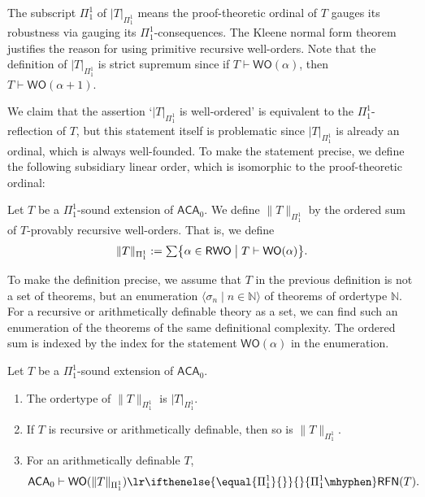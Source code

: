 \documentclass{mhkr}
\newcommand{\added}[1]{#1}
\newcommand{\lag}{\langle}
\newcommand{\rag}{\rangle}
\newcommand{\bbN}{\mathbb{N}}
\newcommand{\WO}{\mathsf{WO}}
\newcommand{\RFN}[1][]{\ifthenelse{\equal{#1}{}}{}{#1\mhyphen}\mathsf{RFN}}
\newcommand{\ACA}{\mathsf{ACA}}
\begin{document}
The subscript $\Pi^1_1$ of $|T|_{\Pi^1_1}$ means the proof-theoretic ordinal of $T$ gauges its robustness via gauging its $\Pi^1_1$-consequences.
The Kleene normal form theorem justifies the reason for using primitive recursive well-orders. 
\added{Note that the definition of $|T|_{\Pi^1_1}$ is strict supremum since if $T\vdash \WO(\alpha)$, then $T\vdash \WO(\alpha+1)$.

We claim that the assertion `$|T|_{\Pi^1_1}$ is well-ordered' is equivalent to the $\Pi^1_1$-reflection of $T$, but this statement itself is problematic since $|T|_{\Pi^1_1}$ is already an ordinal, which is always well-founded. To make the statement precise, we define the following subsidiary linear order, which is isomorphic to the proof-theoretic ordinal:
\begin{definition}
    Let $T$ be a $\Pi^1_1$-sound extension of $\ACA_0$. We define $\|T\|_{\Pi^1_1}$ by the ordered sum of $T$-provably recursive well-orders. That is, we define
    \begin{equation*} \textstyle
        \|T\|_{\Pi^1_1} := \sum \bigl\{\alpha \in \mathsf{RWO} \bigm| T\vdash\WO(\alpha)\bigr\}.
    \end{equation*}
\end{definition}
To make the definition precise, we assume that $T$ in the previous definition is not a set of theorems, but an enumeration $\lag \sigma_n\mid n\in \bbN\rag$ of theorems of ordertype $\bbN$. For a recursive or arithmetically definable theory as a set, we can find such an enumeration of the theorems of the same definitional complexity. The ordered sum is indexed by the index for the statement $\WO(\alpha)$ in the enumeration.
}
\begin{theorem}\label{Theorem: Pi 1 1 reflection and WOness of proof-theoretic ordinal}
    Let $T$ be a $\Pi^1_1$-sound extension of $\ACA_0$. \added{
    \begin{enumerate}
        \item The ordertype of $\|T\|_{\Pi^1_1}$ is $|T|_{\Pi^1_1}$.
        \item If $T$ is recursive or arithmetically definable, then so is $\|T\|_{\Pi^1_1}$.
        \item For an arithmetically definable $T$, 
        \begin{equation*}
            \ACA_0\vdash \WO(\|T\|_{\Pi^1_1}) \lr \RFN[\Pi^1_1](T).
        \end{equation*}
    \end{enumerate}}
\end{theorem}
\end{document}
